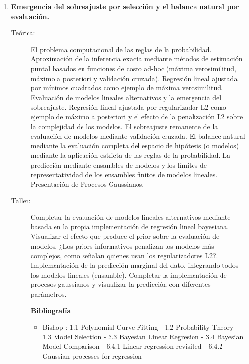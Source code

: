 \documentclass[10pt]{article}
\begin{document}
\begin{enumerate}
\item \textbf{Emergencia del sobreajuste por selección y el balance natural por evaluación.}
\vspace{-0.15cm}
\begin{description}
\item[Teórica:] El problema computacional de las reglas de la probabilidad. Aproximación de la inferencia exacta mediante métodos de estimación puntal basados en funciones de costo ad-hoc (máxima verosimilitud, máximo a posteriori y validación cruzada). Regresión lineal ajustada por mínimos cuadrados como ejemplo de máxima verosimilitud. Evaluación de modelos lineales alternativos y la emergencia del sobreajuste.
Regresión lineal ajustada por regularizador L2 como ejemplo de máximo a posteriori y el efecto de la penalización L2 sobre la complejidad de los modelos.
El sobreajuste remanente de la evaluación de modelos mediante validación cruzada.
El balance natural mediante la evaluación completa del espacio de hipótesis (o modelos) mediante la aplicación estricta de las reglas de la probabilidad.
La predicción mediante ensambles de modelos y los límites de representatividad de los ensambles finitos de modelos lineales.
Presentación de Procesos Gaussianos.
\item[Taller:]
Completar la evaluación de modelos lineales alternativos mediante basada en la propia implementación de regresión lineal bayesiana.
Visualizar el efecto que produce el prior sobre la evaluación de modelos.
¿Los priors informativos penalizan los modelos más complejos, como señalan quienes usan los regularizadores L2?.
Implementación de la predicción marginal del dato, integrando todos los modelos lineales (ensamble).
Completar la implementación de procesos gaussianos y visualizar la predicción con diferentes parámetros.
\item[] \textbf{Bibliografía}
\begin{itemize}
\item Bishop \cite{bishop2006-PRML}: 1.1 Polynomial Curve Fitting - 1.2 Probability Theory - 1.3 Model Selection - 3.3 Bayesian Linear Regresion - 3.4 Bayesian Model Comparison - 6.4.1 Linear regression revisited - 6.4.2 Gaussian processes for regression
\end{itemize}
\end{description}



\end{enumerate}
\end{document}
